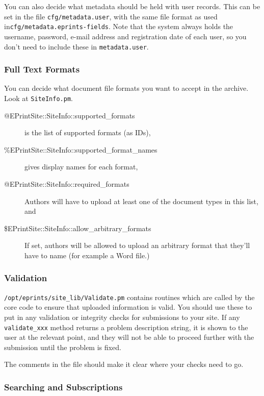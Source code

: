 You can also decide what metadata should be held with user records. This can be set in the file {\tt cfg/metadata.user}, with the same file format as used in{\tt cfg/metadata.eprints-fields}. Note that the system always holds the username, password, e-mail address and registration date of each user, so you don't need to include these in {\tt metadata.user}.


\subsubsection{Full Text Formats}

You can decide what document file formats you want to accept in the archive. Look at {\tt SiteInfo.pm}.

\begin{description}
\item[@EPrintSite::SiteInfo::supported\_formats] is the list of supported formats (as IDs),
\item[\%EPrintSite::SiteInfo::supported\_format\_names] gives display names for each format,
\item[@EPrintSite::SiteInfo::required\_formats] Authors will have to upload at least one of the document types in this list, and
\item[\$EPrintSite::SiteInfo::allow\_arbitrary\_formats] If set, authors will be allowed to upload an arbitrary format that they'll have to name (for example a Word file.)
\end{description}


\subsubsection{Validation}

{\tt /opt/eprints/site\_lib/Validate.pm} contains routines which are called by the core code to ensure that uploaded information is valid. You should use these to put in any validation or integrity checks for submissions to your site. If any {\tt validate\_xxx} method returns a problem description string, it is shown to the user at the relevant point, and they will not be able to proceed further with the submission until the problem is fixed.

The comments in the file should make it clear where your checks need to go.


\subsubsection{Searching and Subscriptions}

